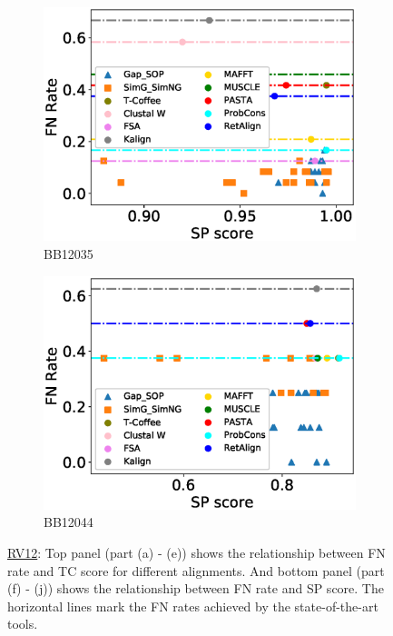 \begin{figure}[!htbp]
\begin{adjustwidth}{-1.5cm}{-1cm}
\begin{subfigure}{0.22\textwidth}
			\includegraphics[width=\columnwidth]{Figure/summary/precomputedInit/Balibase/BB12035_fnrate_vs_sp_2}
			\caption{BB12035}
		\end{subfigure}	
		\begin{subfigure}{0.22\textwidth}
			\includegraphics[width=\columnwidth]{Figure/summary/precomputedInit/Balibase/BB12044_fnrate_vs_sp_2}
			\caption{BB12044}
		\end{subfigure}
		\end{adjustwidth}
		\caption[FN rate vs TC score on RV12]{\underline{RV12}: Top panel (part (a) - (e)) shows the relationship between FN rate and TC score for different alignments. And bottom panel (part (f) - (j)) shows the relationship between FN rate and SP score. The horizontal lines mark the FN rates achieved by the state-of-the-art tools.}
		\label{fig:rv12_fnrate_vs_tc}

\end{figure}
